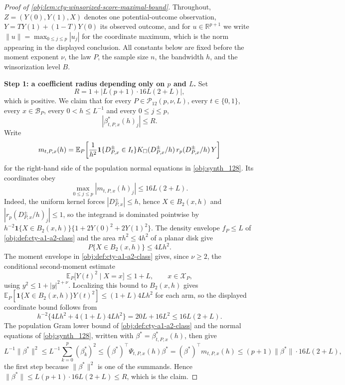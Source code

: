 \documentclass[11pt]{article}
\begin{document}
\begin{proof}[Proof of \cref{obj:lem:cty-winsorized-score-maximal-bound}]
Throughout, \(Z=(Y(0),Y(1),X)\) denotes one potential-outcome observation, \(Y=TY(1)+(1-T)Y(0)\) its observed outcome, and for \(u\in\mathbb R^{p+1}\) we write \(\lVert u\rVert=\max_{0\leq j\leq p}|u_j|\) for the coordinate maximum, which is the norm appearing in the displayed conclusion.  All constants below are fixed before the moment exponent \(\nu\), the law \(P\), the sample size \(n\), the bandwidth \(h\), and the winsorization level \(B\).

\textbf{Step 1: a coefficient radius depending only on \(p\) and \(L\).}  Set
\[
R=1+\left|L(p+1)\cdot 16L(2+L)\right|,
\]
which is positive.  We claim that for every \(P\in\mathcal P_{12}(p,\nu,L)\), every \(t\in\{0,1\}\), every \(x\in\mathcal B_P\), every \(0<h\leq L^{-1}\) and every \(0\leq j\leq p\),
\[
\left|\beta^*_{t,P,x}(h)_j\right|\leq R .
\]
Write
\[
m_{t,P,x}(h)
=
\mathbb E_P\!\left[
{1\over h^2}\mathbf 1\{D^{\pm}_{P,x}\in I_t\}
K_\square(D^{\pm}_{P,x}/h)\,r_p(D^{\pm}_{P,x}/h)\,Y
\right]
\]
for the right-hand side of the population normal equations in \cref{obj:synth_128}.  Its coordinates obey
\[
\max_{0\leq j\leq p}\left|m_{t,P,x}(h)_j\right|\leq 16L(2+L).
\]
Indeed, the uniform kernel forces \(|D^{\pm}_{P,x}|\leq h\), hence \(X\in B_2(x,h)\) and \(|r_p(D^{\pm}_{P,x}/h)_j|\leq1\), so the integrand is dominated pointwise by \(h^{-2}\mathbf 1\{X\in B_2(x,h)\}\{1+2Y(0)^2+2Y(1)^2\}\).  The density envelope \(f_P\leq L\) of \cref{obj:def:cty-a1-a2-class} and the area \(\pi h^2\leq4h^2\) of a planar disk give
\[
P\{X\in B_2(x,h)\}\leq 4Lh^2 .
\]
The moment envelope in \cref{obj:def:cty-a1-a2-class} gives, since \(\nu\geq2\), the conditional second-moment estimate
\[
\mathbb E_P\bigl[Y(t)^2\mid X=x\bigr]\leq 1+L,
\qquad x\in\mathcal X_P,
\]
using \(y^2\leq 1+|y|^{2+\nu}\).  Localizing this bound to \(B_2(x,h)\) gives \(\mathbb E_P[\mathbf 1\{X\in B_2(x,h)\}Y(t)^2]\leq (1+L)4Lh^2\) for each arm, so the displayed coordinate bound follows from
\[
h^{-2}\bigl\{4Lh^2+4(1+L)4Lh^2\bigr\}
=20L+16L^2
\leq
16L(2+L).
\]
The population Gram lower bound of \cref{obj:def:cty-a1-a2-class} and the normal equations of \cref{obj:synth_128}, written with \(\beta^*=\beta^*_{t,P,x}(h)\), then give
\[
L^{-1}\lVert\beta^*\rVert^2
\leq
L^{-1}\sum_{k=0}^p(\beta^*_k)^2
\leq
(\beta^*)^\top\Psi_{t,P,x}(h)\beta^*
=
(\beta^*)^\top m_{t,P,x}(h)
\leq
(p+1)\lVert\beta^*\rVert\cdot 16L(2+L),
\]
the first step because \(\lVert\beta^*\rVert^2\) is one of the summands.  Hence \(\lVert\beta^*\rVert\leq L(p+1)\cdot16L(2+L)\leq R\), which is the claim.


\end{proof}
\end{document}
